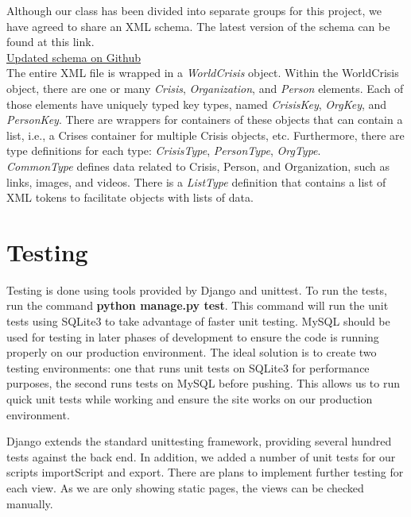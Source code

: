 \documentclass[12pt]{report}
\begin{document}
Although our class has been divided into separate groups for this project, we have agreed to share an XML schema.
The latest version of the schema can be found at this link.\\


\href{https://github.com/aaronj1335/cs373-wcdb1-schema/blob/master/WorldCrises.xsd.xml}{Updated schema on Github}\\


The entire XML file is wrapped in a \emph{WorldCrisis} object.
Within the WorldCrisis object, there are one or many \emph{Crisis}, \emph{Organization}, and \emph{Person} elements.
Each of those elements have uniquely typed key types, named \emph{CrisisKey}, \emph{OrgKey}, and \emph{PersonKey}.
There are wrappers for containers of these objects that can contain a list,
i.e., a Crises container for multiple Crisis objects, etc.
Furthermore, there are type definitions for each type: \emph{CrisisType}, \emph{PersonType}, \emph{OrgType}.\\


\emph{CommonType} defines data related to Crisis, Person, and Organization,
such as links, images, and videos.
There is a \emph{ListType} definition that contains a list of XML tokens to facilitate objects with lists of data.

\newpage
\section*{Testing}
\hfill


Testing is done using tools provided by Django and unittest.
To run the tests, run the command \textbf{python manage.py test}.
This command will run the unit tests using SQLite3 to take advantage of faster unit testing.
MySQL should be used for testing in later phases of development to ensure the code is running properly on our production environment.
The ideal solution is to create two testing environments: one that runs unit tests on SQLite3 for performance purposes,
the second runs tests on MySQL before pushing.
This allows us to run quick unit tests while working and ensure the site works on our production environment.


Django extends the standard unittesting framework, providing several hundred tests against the back end.
In addition, we added a number of unit tests for our scripts importScript and export.
There are plans to implement further testing for each view.
As we are only showing static pages, the views can be checked manually.
\end{document}
